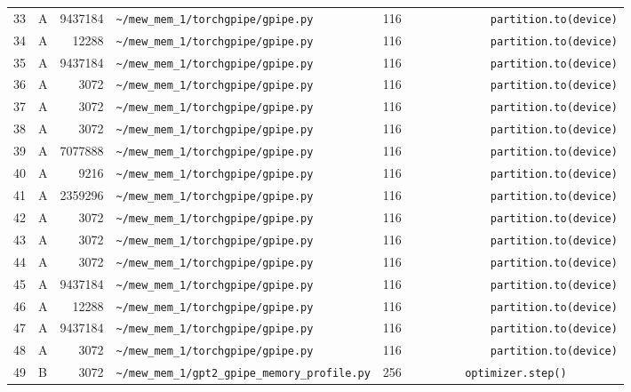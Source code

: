 \documentclass{article}
\begin{document}
\begin{longtable}{r l r p{6.5cm} r p{7.0cm}}
33 & A & 9437184 & \lstinline|~/mew_mem_1/torchgpipe/gpipe.py| & 116 & \lstinline|            partition.to(device)| \\
34 & A & 12288 & \lstinline|~/mew_mem_1/torchgpipe/gpipe.py| & 116 & \lstinline|            partition.to(device)| \\
35 & A & 9437184 & \lstinline|~/mew_mem_1/torchgpipe/gpipe.py| & 116 & \lstinline|            partition.to(device)| \\
36 & A & 3072 & \lstinline|~/mew_mem_1/torchgpipe/gpipe.py| & 116 & \lstinline|            partition.to(device)| \\
37 & A & 3072 & \lstinline|~/mew_mem_1/torchgpipe/gpipe.py| & 116 & \lstinline|            partition.to(device)| \\
38 & A & 3072 & \lstinline|~/mew_mem_1/torchgpipe/gpipe.py| & 116 & \lstinline|            partition.to(device)| \\
39 & A & 7077888 & \lstinline|~/mew_mem_1/torchgpipe/gpipe.py| & 116 & \lstinline|            partition.to(device)| \\
40 & A & 9216 & \lstinline|~/mew_mem_1/torchgpipe/gpipe.py| & 116 & \lstinline|            partition.to(device)| \\
41 & A & 2359296 & \lstinline|~/mew_mem_1/torchgpipe/gpipe.py| & 116 & \lstinline|            partition.to(device)| \\
42 & A & 3072 & \lstinline|~/mew_mem_1/torchgpipe/gpipe.py| & 116 & \lstinline|            partition.to(device)| \\
43 & A & 3072 & \lstinline|~/mew_mem_1/torchgpipe/gpipe.py| & 116 & \lstinline|            partition.to(device)| \\
44 & A & 3072 & \lstinline|~/mew_mem_1/torchgpipe/gpipe.py| & 116 & \lstinline|            partition.to(device)| \\
45 & A & 9437184 & \lstinline|~/mew_mem_1/torchgpipe/gpipe.py| & 116 & \lstinline|            partition.to(device)| \\
46 & A & 12288 & \lstinline|~/mew_mem_1/torchgpipe/gpipe.py| & 116 & \lstinline|            partition.to(device)| \\
47 & A & 9437184 & \lstinline|~/mew_mem_1/torchgpipe/gpipe.py| & 116 & \lstinline|            partition.to(device)| \\
48 & A & 3072 & \lstinline|~/mew_mem_1/torchgpipe/gpipe.py| & 116 & \lstinline|            partition.to(device)| \\
49 & B & 3072 & \lstinline|~/mew_mem_1/gpt2_gpipe_memory_profile.py| & 256 & \lstinline|        optimizer.step()| \\

\end{longtable}
\end{document}
